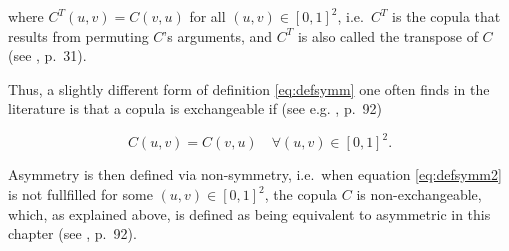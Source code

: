 \documentclass[
]{krantz}
\begin{document}
where \(C^T(u,v) = C(v,u)\) for all \((u,v) \in [0,1]^2\), i.e.~\(C^T\) is the copula that results from permuting \(C\)'s arguments, and \(C^T\) is also called the transpose of \(C\) (see \citet{durante2016}, p.~31).

Thus, a slightly different form of definition \eqref{eq:defsymm} one often finds in the literature is that a copula is exchangeable if (see e.g. \citet{genest2013}, p.~92)

\begin{equation}
C(u,v)=C(v,u) \quad \forall (u,v) \in [0,1]^2.
\label{eq:defsymm2}
\end{equation}

Asymmetry is then defined via non-symmetry, i.e.~when equation \eqref{eq:defsymm2} is not fullfilled for some \((u,v) \in [0,1]^2\), the copula \(C\) is non-exchangeable, which, as explained above, is defined as being equivalent to asymmetric in this chapter (see \citet{genest2013}, p.~92).
\end{document}
